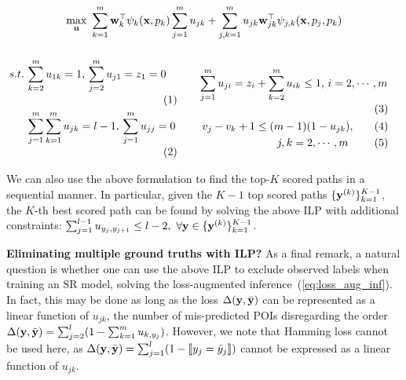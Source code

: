 \begin{equation}
\label{eq:obj}
\max_{\mathbf{u}} ~\sum_{k=1}^m \mathbf{w}_k^\top \psi_k(\mathbf{x}, p_k) \sum_{j=1}^m u_{jk} +
            \sum_{j,k=1}^m u_{jk} \mathbf{w}_{jk}^\top \psi_{j, k}(\mathbf{x}, p_j, p_k)
\end{equation}
{$\displaystyle
\begin{minipage}{0.45\linewidth}
\begin{alignat}{2}
s.t. \, 
& \sum_{k=2}^m u_{1k} = 1, \, \sum_{j=2}^m u_{j1} = z_1=0                 \label{eq:cons1} \\
& \sum_{j=1}^m \sum_{k=1}^m u_{jk} = l-1, \, \sum_{j=1}^m u_{jj}=0        \label{eq:cons2}
\end{alignat}
\end{minipage}
\qquad
\begin{minipage}{0.5\linewidth}
\begin{alignat}{3}
\sum_{j=1}^m u_{ji} = z_i &+ \sum_{k=2}^m u_{ik} \le 1, \, i = 2,\cdots,m  \label{eq:cons3} \\
v_j - v_k + 1 &\le (m-1) (1-u_{jk}),                                       \nonumber \\
              & \qquad j,k = 2,\cdots,m                                    \label{eq:cons4}
\end{alignat}
\end{minipage}
$}

We can also use the above formulation to find the top-$K$ scored paths in a sequential manner. 
In particular, given the $K\!-\!1$ top scored paths $\{\mathbf{y}^{({k})}\}_{k=1}^{K-1}$, 
the $K\!$-th best scored path can be found by solving the above ILP with additional constraints:
$\sum_{j=1}^{l-1} u_{y_j, y_{j+1}} \le l-2, ~\forall \mathbf{y} \in \{\mathbf{y}^{(k)}\}_{k=1}^{K-1}$.

\textbf{Eliminating multiple ground truths with ILP?}
As a final remark, a natural question is whether one can use the above ILP 
to exclude observed labels when training an SR model,
\ie solving the loss-augmented inference~(\ref{eq:loss_aug_inf}).
In fact, this may be done
as long as the loss $\Delta(\mathbf{y},\bar{\mathbf{y}})$ can be represented as a linear function of $u_{jk}$,
\eg the number of mis-predicted POIs disregarding the order $\Delta(\mathbf{y}, \bar{\mathbf{y}}) = \sum_{j=2}^l (1 - \sum_{k=1}^m u_{k, y_j})$.
However, we note that Hamming loss %
cannot be used here, as $\Delta(\mathbf{y},\bar{\mathbf{y}}) = \sum_{j=1}^l (1 - \llbracket y_j = \bar y_j \rrbracket)$
cannot be expressed as a linear function of $u_{jk}$.


